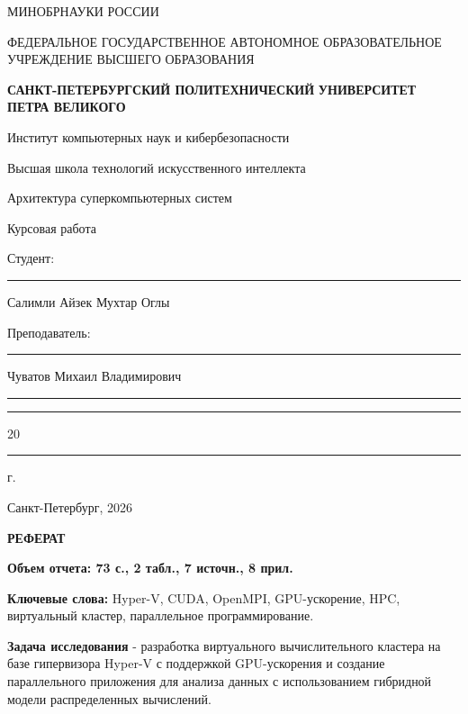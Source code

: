 \documentclass[areaset=advanced]{scrartcl}
\begin{document}
\sloppy
	\thispagestyle{empty}
	\begin{center}
		\large{МИНОБРНАУКИ РОССИИ} \par
		\vspace{0.3cm}
		\normalsize
		{ФЕДЕРАЛЬНОЕ ГОСУДАРСТВЕННОЕ АВТОНОМНОЕ ОБРАЗОВАТЕЛЬНОЕ УЧРЕЖДЕНИЕ ВЫСШЕГО ОБРАЗОВАНИЯ} \par
		\vspace{0.3cm}
		\textbf{\guillemotleft САНКТ-ПЕТЕРБУРГСКИЙ ПОЛИТЕХНИЧЕСКИЙ}
		\textbf{УНИВЕРСИТЕТ ПЕТРА ВЕЛИКОГО\guillemotright} \par
		\vspace{0.3cm}
		{Институт компьютерных наук и кибербезопасности}\par
		{Высшая школа технологий искусственного интеллекта}\par
	\end{center}
	\vfill
	\begin{center}
        \par
		{\Huge Архитектура суперкомпьютерных систем}\par
        \huge {Курсовая работа}\par
	\end{center}
	\vfill
	\begin{flushleft}
		Студент: \hspace{1.8cm} \rule[0pt]{2.5cm}{0.5pt}\hfill Салимли Айзек Мухтар Оглы\par
		\vspace{1.5cm}
		Преподаватель: \hspace{0.55cm} \rule[0pt]{2.5cm}{0.5pt}\hfill  Чуватов Михаил Владимирович
	\end{flushleft}
	\vspace{0.5cm}
	\begin{flushright}
		\guillemotleft \rule[0pt]{0.8cm}{0.5pt}\guillemotright \rule[0pt]{2cm}{0.5pt} 20\rule[0pt]{0.5cm}{0.5pt} г.
	\end{flushright}
	\vfill
	\begin{center}
		Санкт-Петербург, 2026
	\end{center}
\newpage
\begin{center}
	\textbf{РЕФЕРАТ}
\end{center}
\textbf{Объем отчета: 73 с., 2 табл., 7 источн., 8 прил.}

\textbf{Ключевые слова:} Hyper-V, CUDA, OpenMPI, GPU-ускорение, HPC, виртуальный кластер, параллельное программирование. 

\textbf{Задача исследования} - разработка виртуального вычислительного кластера на базе гипервизора Hyper-V с поддержкой GPU-ускорения и
создание параллельного приложения для анализа данных с использованием гибридной модели распределенных вычислений.
\end{document}
